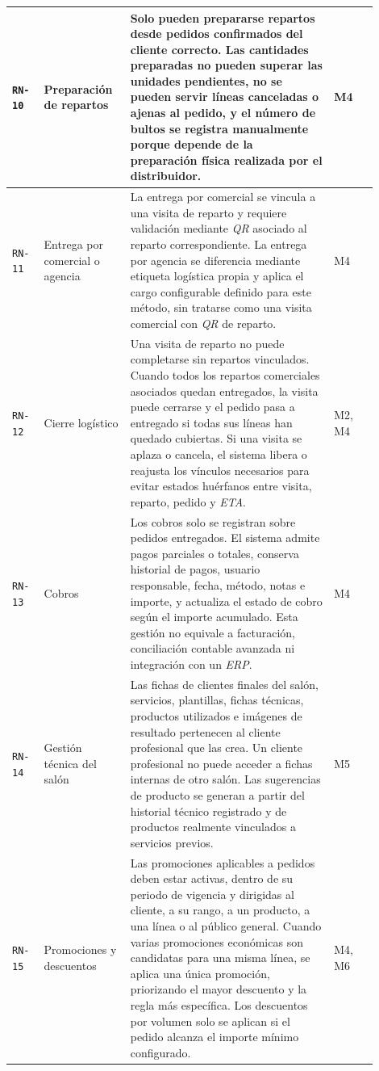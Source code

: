 {\begin{supertabular}{|>{\raggedright\arraybackslash}p{0.08\linewidth}|>{\raggedright\arraybackslash}p{0.20\linewidth}|>{\raggedright\arraybackslash}p{0.51\linewidth}|>{\raggedright\arraybackslash}p{0.11\linewidth}|}
\texttt{RN-10} & Preparación de repartos & Solo pueden prepararse repartos desde pedidos confirmados del cliente correcto. Las cantidades preparadas no pueden superar las unidades pendientes, no se pueden servir líneas canceladas o ajenas al pedido, y el número de bultos se registra manualmente porque depende de la preparación física realizada por el distribuidor. & M4 \\
\hline

\texttt{RN-11} & Entrega por comercial o agencia & La entrega por comercial se vincula a una visita de reparto y requiere validación mediante \textit{QR} asociado al reparto correspondiente. La entrega por agencia se diferencia mediante etiqueta logística propia y aplica el cargo configurable definido para este método, sin tratarse como una visita comercial con \textit{QR} de reparto. & M4 \\
\hline

\texttt{RN-12} & Cierre logístico & Una visita de reparto no puede completarse sin repartos vinculados. Cuando todos los repartos comerciales asociados quedan entregados, la visita puede cerrarse y el pedido pasa a entregado si todas sus líneas han quedado cubiertas. Si una visita se aplaza o cancela, el sistema libera o reajusta los vínculos necesarios para evitar estados huérfanos entre visita, reparto, pedido y \textit{ETA}. & M2, M4 \\
\hline

\texttt{RN-13} & Cobros & Los cobros solo se registran sobre pedidos entregados. El sistema admite pagos parciales o totales, conserva historial de pagos, usuario responsable, fecha, método, notas e importe, y actualiza el estado de cobro según el importe acumulado. Esta gestión no equivale a facturación, conciliación contable avanzada ni integración con un \textit{ERP}. & M4 \\
\hline

\texttt{RN-14} & Gestión técnica del salón & Las fichas de clientes finales del salón, servicios, plantillas, fichas técnicas, productos utilizados e imágenes de resultado pertenecen al cliente profesional que las crea. Un cliente profesional no puede acceder a fichas internas de otro salón. Las sugerencias de producto se generan a partir del historial técnico registrado y de productos realmente vinculados a servicios previos. & M5 \\
\hline

\texttt{RN-15} & Promociones y descuentos & Las promociones aplicables a pedidos deben estar activas, dentro de su periodo de vigencia y dirigidas al cliente, a su rango, a un producto, a una línea o al público general. Cuando varias promociones económicas son candidatas para una misma línea, se aplica una única promoción, priorizando el mayor descuento y la regla más específica. Los descuentos por volumen solo se aplican si el pedido alcanza el importe mínimo configurado. & M4, M6 \\
\hline


\end{supertabular}}
